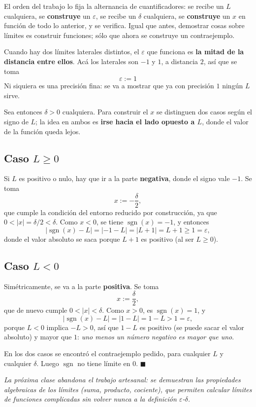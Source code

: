 \documentclass[12pt,a4paper]{article}
\begin{document}
El orden del trabajo lo fija la alternancia de cuantificadores: se recibe un
$L$ cualquiera, se \textbf{construye} un $\varepsilon$, se recibe un $\delta$
cualquiera, se \textbf{construye} un $x$ en función de todo lo anterior, y se
verifica. Igual que antes, demostrar cosas sobre límites es construir
funciones; sólo que ahora se construye un contraejemplo.

\begin{keybox}
Cuando hay dos límites laterales distintos, el $\varepsilon$ que funciona es
\textbf{la mitad de la distancia entre ellos}. Acá los laterales son $-1$ y
$1$, a distancia $2$, así que se toma
\[
  \boxed{\varepsilon := 1}
\]
Ni siquiera es una precisión fina: se va a mostrar que ya con precisión $1$
ningún $L$ sirve.
\end{keybox}

Sea entonces $\delta > 0$ cualquiera. Para construir el $x$ se distinguen dos
casos según el signo de $L$; la idea en ambos es \textbf{irse hacia el lado
opuesto a $L$}, donde el valor de la función queda lejos.



\subsection{Caso $L \geq 0$}

Si $L$ es positivo o nulo, hay que ir a la parte \textbf{negativa}, donde el
signo vale $-1$. Se toma
\[
  x := -\frac{\delta}{2},
\]
que cumple la condición del entorno reducido por construcción, ya que
$0 < |x| = \delta/2 < \delta$. Como $x < 0$, se tiene
$\operatorname{sgn}(x) = -1$, y entonces
\[
  \left|\operatorname{sgn}(x) - L\right| = \left|-1 - L\right|
  = \left|L + 1\right| = L + 1 \geq 1 = \varepsilon,
\]
donde el valor absoluto se saca porque $L + 1$ es positivo (al ser $L \geq 0$).

\subsection{Caso $L < 0$}

Simétricamente, se va a la parte \textbf{positiva}. Se toma
\[
  x := \frac{\delta}{2},
\]
que de nuevo cumple $0 < |x| < \delta$. Como $x > 0$, es
$\operatorname{sgn}(x) = 1$, y
\[
  \left|\operatorname{sgn}(x) - L\right| = \left|1 - L\right|
  = 1 - L > 1 = \varepsilon,
\]
porque $L < 0$ implica $-L > 0$, así que $1 - L$ es positivo (se puede sacar el
valor absoluto) y mayor que $1$: \emph{uno menos un número negativo es mayor
que uno}.

En los dos casos se encontró el contraejemplo pedido, para cualquier $L$ y
cualquier $\delta$. Luego $\operatorname{sgn}$ no tiene límite en $0$.
$\blacksquare$

\vspace{1em}
\noindent\emph{La próxima clase abandona el trabajo artesanal: se demuestran
las propiedades algebraicas de los límites (suma, producto, cociente), que
permiten calcular límites de funciones complicadas sin volver nunca a la
definición $\varepsilon$-$\delta$.}
\end{document}
